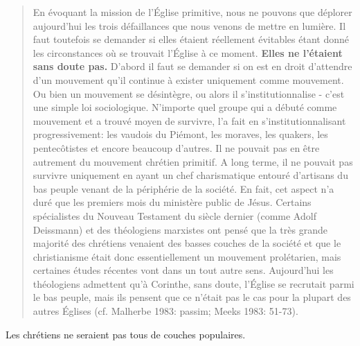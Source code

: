 \begin{quote}
    En évoquant la mission de l'Église primitive, nous ne pouvons que
déplorer aujourd'hui les trois défaillances que nous venons de mettre
en lumière. Il faut toutefois se demander si elles étaient réellement
évitables étant donné les circonstances où se trouvait l'Église à ce
moment. \textbf{Elles ne l'étaient sans doute pas.}
D'abord il faut se demander si on est en droit d'attendre d'un
mouvement qu'il continue à exister uniquement comme mouvement.
Ou bien un mouvement se désintègre, ou alors il s'institutionnalise -
c'est une simple loi sociologique. N'importe quel groupe qui a débuté
comme mouvement et a trouvé moyen de survivre, l'a fait en
s'institutionnalisant progressivement: les vaudois du Piémont, les
moraves, les quakers, les pentecôtistes et encore beaucoup d'autres. Il
ne pouvait pas en être autrement du mouvement chrétien primitif. A
long terme, il ne pouvait pas survivre uniquement en ayant un chef
charismatique entouré d'artisans du bas peuple venant de la périphérie
de la société. En fait, cet aspect n'a duré que les premiers mois du
ministère public de Jésus. Certains spécialistes du Nouveau Testament
du siècle dernier (comme Adolf Deissmann) et des théologiens
marxistes ont pensé que la très grande majorité des chrétiens venaient
des basses couches de la société et que le christianisme était donc
essentiellement un mouvement prolétarien, mais certaines études
récentes vont dans un tout autre sens. Aujourd'hui les théologiens
admettent qu'à Corinthe, sans doute, l'Église se recrutait parmi le bas
peuple, mais ils pensent que ce n'était pas le cas pour la plupart des
autres Églises (cf. Malherbe 1983: passim; Meeks 1983: 51-73).

\end{quote}

Les chrétiens ne seraient pas tous de couches populaires. 

